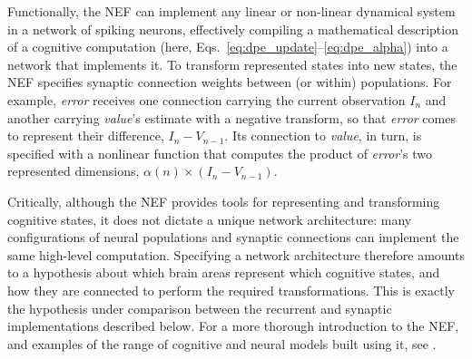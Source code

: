 \documentclass[12pt]{article}
\begin{document}
Functionally, the NEF can implement any linear or non-linear dynamical system in a network of spiking neurons, effectively compiling a mathematical description of a cognitive computation (here, Eqs.~\ref{eq:dpe_update}--\ref{eq:dpe_alpha}) into a network that implements it. To transform represented states into new states, the NEF specifies synaptic connection weights between (or within) populations. For example, \textit{error} receives one connection carrying the current observation $I_n$ and another carrying \textit{value}'s estimate with a negative transform, so that \textit{error} comes to represent their difference, $I_n - V_{n-1}$. Its connection to \textit{value}, in turn, is specified with a nonlinear function that computes the product of \textit{error}'s two represented dimensions, $\alpha(n) \times (I_n-V_{n-1})$.

Critically, although the NEF provides tools for representing and transforming cognitive states, it does not dictate a unique network architecture: many configurations of neural populations and synaptic connections can implement the same high-level computation. Specifying a network architecture therefore amounts to a hypothesis about which brain areas represent which cognitive states, and how they are connected to perform the required transformations. This is exactly the hypothesis under comparison between the recurrent and synaptic implementations described below. For a more thorough introduction to the NEF, and examples of the range of cognitive and neural models built using it, see \cite{eliasmith2013build, choo2018spaun, dumont2023biologically, duggins2022constructing, duggins2024spiking, dumont2022}.
\end{document}

